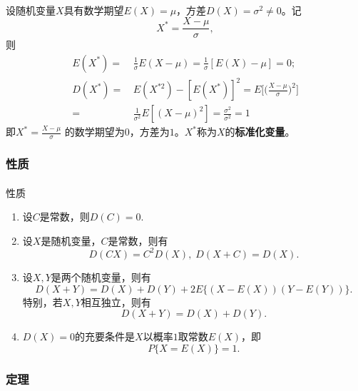 \paragraph{}
设随机变量$X$具有数学期望$E(X)=\mu$，方差$D(X)=\sigma^2 \neq 0$。记
\begin{equation}
  X^* = \frac{X-\mu}{\sigma},
\end{equation}
则
\begin{align*}
  E(X^*) =&\, \frac{1}{\sigma}E(X-\mu)=\frac{1}{\sigma}[E(X)-\mu] = 0; \\
  D(X^*) =&\, E(X^{*2}) - [E(X^*)]^2 = E\Big[\Big(\frac{X-\mu}{\sigma}\Big)^2\Big] \\
         =&\, \frac{1}{\sigma^2}E[(X-\mu)^2]=\frac{\sigma^2}{\sigma^2} = 1
\end{align*}
即$\displaystyle X^* = \frac{X-\mu}{\sigma}$ 的数学期望为$0$，方差为$1$。$X^*$称为$X$的\textbf{标准化变量}。

\subsubsection{性质}
\paragraph{}
性质
\begin{enumerate}
  \item 设$C$是常数，则$D(C)=0$.
  \item 设$X$是随机变量，$C$是常数，则有
  \begin{equation*}
    D(CX) = C^2D(X), \; D(X+C)=D(X).
  \end{equation*}
  \item 设$X,Y$是两个随机变量，则有
  \begin{equation*}
    D(X+Y) = D(X) + D(Y) + 2E\{(X-E(X))(Y-E(Y))\}.
  \end{equation*}
  特别，若$X,Y$相互独立，则有
  \begin{equation*}
    D(X+Y) = D(X) + D(Y).
  \end{equation*}
  \item $D(X)=0$的充要条件是$X$以概率$1$取常数$E(X)$，即
  \begin{equation*}
    P\{X=E(X)\} = 1.
  \end{equation*}
\end{enumerate}

\subsubsection{定理}
